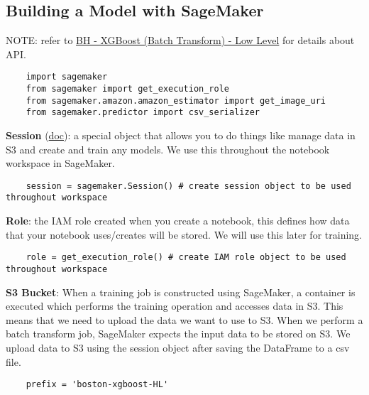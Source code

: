 \documentclass[11pt, a4paper]{article}
\begin{document}
\begin{spacing}{1.1}
	\subsection{Building a Model with SageMaker}
	\begin{center}
	\color{darkgray} NOTE: refer to \href{file:///E:/Documents/UdacityNotes/ML\%20Engineer/sample\_code/BH\%20-\%20XGBoost\%20(Batch\%20Transform)\%20-\%20Low\%20Level.html}{BH - XGBoost (Batch Transform) - Low Level} for details about API. \color{black}
	\end{center}
	\begin{lstlisting}
	import sagemaker
	from sagemaker import get_execution_role
	from sagemaker.amazon.amazon_estimator import get_image_uri
	from sagemaker.predictor import csv_serializer
	\end{lstlisting}\vspace*{2mm}
	\textbf{Session} (\href{https://sagemaker.readthedocs.io/en/latest/session.html}{doc}): a special object that allows you to do things like manage data in S3 and create and train any models. We use this throughout the notebook workspace in SageMaker.
	\begin{lstlisting}
	session = sagemaker.Session() # create session object to be used throughout workspace
	\end{lstlisting}\vspace*{2mm}
	\textbf{Role}: the IAM role created when you create a notebook, this defines how data that your notebook uses/creates will be stored. We will use this later for training. 
	\begin{lstlisting}
	role = get_execution_role() # create IAM role object to be used throughout workspace
	\end{lstlisting}\vspace*{2mm}
	\textbf{S3 Bucket}: When a training job is constructed using SageMaker, a container is executed which performs the training operation and accesses data in S3. This means that we need to upload the data we want to use to S3. When we perform a batch transform job, SageMaker expects the input data to be stored on S3. We upload data to S3 using the session object after saving the DataFrame to a csv file. \newpage

	\begin{lstlisting}
	prefix = 'boston-xgboost-HL'
	

\end{lstlisting}
\end{spacing}
\end{document}

